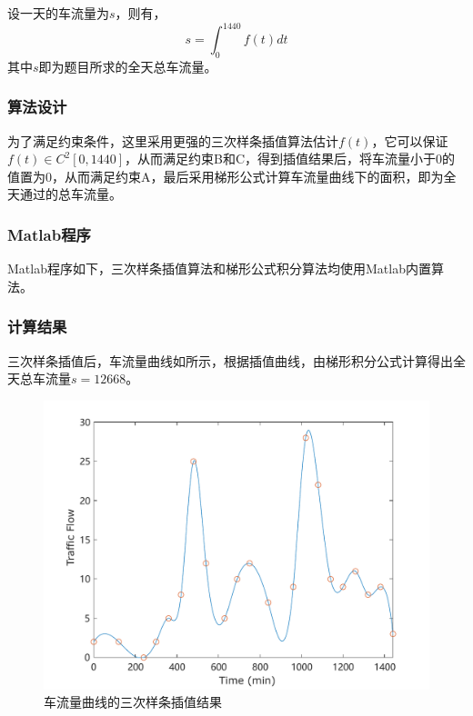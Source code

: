 \documentclass[12pt,a4paper]{article}
\begin{document}
设一天的车流量为$s$，则有，
\begin{equation}
    s = \int_{0}^{1440}f(t) dt
\end{equation}
其中$s$即为题目所求的全天总车流量。

\subsubsection{算法设计}

为了满足约束条件，这里采用更强的三次样条插值算法估计$f(t)$，它可以保证$f(t)\in C^2[0, 1440]$，从而满足约束B和C，得到插值结果后，将车流量小于0的值置为0，从而满足约束A，最后采用梯形公式计算车流量曲线下的面积，即为全天通过的总车流量。

\subsubsection{Matlab程序}

Matlab程序如下，三次样条插值算法和梯形公式积分算法均使用Matlab内置算法。


\subsubsection{计算结果}

三次样条插值后，车流量曲线如所示，根据插值曲线，由梯形积分公式计算得出全天总车流量$s=12668$。
\begin{figure}
    \centering
    \includegraphics[width=\textwidth]{fig/ex12_spline.pdf}
    \caption{车流量曲线的三次样条插值结果}
    \label{fig:ex12_spline}
\end{figure}
\end{document}
